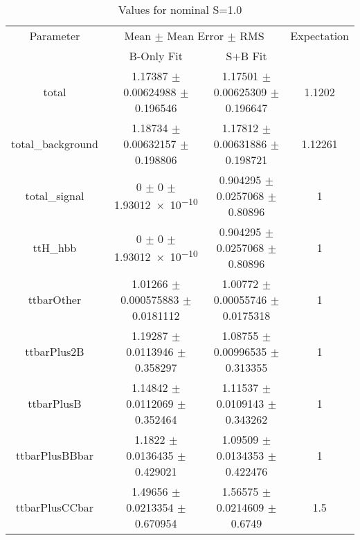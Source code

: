 \begin{table}
\centering
\caption{Values for nominal S=1.0}
\begin{tabular}{cccc}
\toprule
Parameter & \multicolumn{2}{c}{Mean $\pm$ Mean Error $\pm$ RMS} & Expectation\\
 & B-Only Fit & S+B Fit & \\
\midrule
total & \num{1.17387} $\pm$ \num{0.00624988} $\pm$ \num{0.196546} & \num{1.17501} $\pm$ \num{0.00625309} $\pm$ \num{0.196647} & \num{1.1202}\\
total\_background & \num{1.18734} $\pm$ \num{0.00632157} $\pm$ \num{0.198806} & \num{1.17812} $\pm$ \num{0.00631886} $\pm$ \num{0.198721} & \num{1.12261}\\
total\_signal & \num{0} $\pm$ \num{0} $\pm$ \num{1.93012e-10} & \num{0.904295} $\pm$ \num{0.0257068} $\pm$ \num{0.80896} & \num{1}\\
ttH\_hbb & \num{0} $\pm$ \num{0} $\pm$ \num{1.93012e-10} & \num{0.904295} $\pm$ \num{0.0257068} $\pm$ \num{0.80896} & \num{1}\\
ttbarOther & \num{1.01266} $\pm$ \num{0.000575883} $\pm$ \num{0.0181112} & \num{1.00772} $\pm$ \num{0.00055746} $\pm$ \num{0.0175318} & \num{1}\\
ttbarPlus2B & \num{1.19287} $\pm$ \num{0.0113946} $\pm$ \num{0.358297} & \num{1.08755} $\pm$ \num{0.00996535} $\pm$ \num{0.313355} & \num{1}\\
ttbarPlusB & \num{1.14842} $\pm$ \num{0.0112069} $\pm$ \num{0.352464} & \num{1.11537} $\pm$ \num{0.0109143} $\pm$ \num{0.343262} & \num{1}\\
ttbarPlusBBbar & \num{1.1822} $\pm$ \num{0.0136435} $\pm$ \num{0.429021} & \num{1.09509} $\pm$ \num{0.0134353} $\pm$ \num{0.422476} & \num{1}\\
ttbarPlusCCbar & \num{1.49656} $\pm$ \num{0.0213354} $\pm$ \num{0.670954} & \num{1.56575} $\pm$ \num{0.0214609} $\pm$ \num{0.6749} & \num{1.5}\\
\bottomrule
\end{tabular}
\end{table}